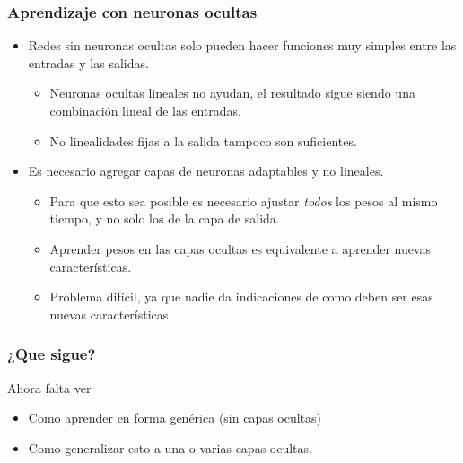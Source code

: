 \message{ !name(intro_rn.tex)}\documentclass{beamer}
\begin{document}
\begin{frame}
  \frametitle{Aprendizaje con neuronas ocultas}

  \begin{itemize}
  \item Redes sin neuronas ocultas solo pueden hacer funciones muy
    simples entre las entradas y las salidas.
    \begin{itemize}
    \item Neuronas ocultas lineales no ayudan, el resultado sigue
      siendo una combinación lineal de las entradas.
    \item No linealidades fijas a la salida tampoco son suficientes.
    \end{itemize}
  \item Es necesario agregar capas de neuronas adaptables y no
    lineales.
    \begin{itemize}
    \item Para que esto sea posible es necesario ajustar \emph{todos}
      los pesos al mismo tiempo, y no solo los de la capa de salida.
    \item Aprender pesos en las capas ocultas es equivalente a
      aprender nuevas características.
    \item Problema difícil, ya que nadie da indicaciones de como deben
      ser esas nuevas características.
    \end{itemize}
  \end{itemize}
  
\end{frame}

\begin{frame}
  \frametitle{¿Que sigue?}
  
  \begin{block}{}
    Ahora falta ver
    \begin{itemize}
    \item Como aprender en forma genérica (sin capas ocultas)
    \item Como generalizar esto a una o varias capas ocultas.
    \end{itemize}
  \end{block}
\end{frame}
\end{document}
